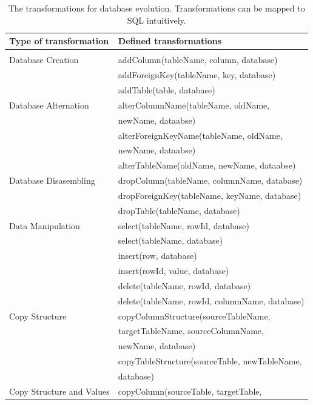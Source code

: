 \documentclass[runningheads]{comsis}
\begin{document}
\begin{table}
\caption{The transformations for database evolution. Transformations can be mapped to SQL intuitively.}
	\label{tab:db-basic-evolution}
\centering
\setlength\tabcolsep{0.5em}
	\begin{tabular}{ll}
	\hline
	Type of transformation & Defined transformations \\
	\hline
	\\[-2ex] Database Creation
	& addColumn(tableName, column, database) \\
	& addForeignKey(tableName, key, database) \\
	& addTable(table, database)\\
	Database Alternation
	& alterColumnName(tableName, oldName, \\ & \hspace{0.5in}newName, dataabse) \\
	& alterForeignKeyName(tableName, oldName, \\ & \hspace{0.5in}newName, dataabse) \\
	& alterTableName(oldName, newName, dataabse) \\
	Database Disasembling
	& dropColumn(tableName, columnName, database) \\
	& dropForeignKey(tableName, keyName, database) \\
	& dropTable(tableName, database) \\
	Data Manipulation
	& select(tableName, rowId, database) \\
	& select(tableName, database) \\
	& insert(row, database) \\
	& insert(rowId, value, database) \\
	& delete(tableName, rowId, database) \\
	& delete(tableName, rowId, columnName, database) \\
	Copy Structure
	& copyColumnStructure(sourceTableName,\\ &  \hspace{0.5in} targetTableName,  sourceColumnName, \\ &  \hspace{0.5in} newName, database) \\
	& copyTableStructure(sourceTable, newTableName, \\ &  \hspace{0.5in} database) \\
	Copy Structure and Values
	& copyColumn(sourceTable, targetTable, \\

\end{tabular}
\end{table}
\end{document}
